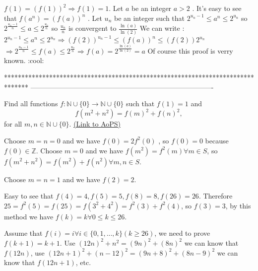 \begin{mysolution}
	$f(1)=(f(1))^{2}\Longrightarrow f(1)=1$. Let $a$ be an integer $a > 2$ . It's easy to see that $f(a^{n})=(f(a))^{n}$ . 
Let $u_{n}$ be an  integer such that $2^{u_{n}-1}\leq a^{n}\leq 2^{u_{n}}$ so $2^{\frac{u_{n}-1}n}\leq a\leq 2^{\frac{u_{n}}n}$ so  $\frac{u_{n}}n$  is convergent to $\frac{\ln (a)}{\ln (2)}$
We can write : 
$2^{u_{n}-1}\leq a^{n}\leq 2^{u_{n}}\Longrightarrow (f(2))^{u_{n}-1}\leq (f(a))^{n}\leq (f(2))2^{u_{n}}$$\Longrightarrow 2^{\frac{u_{n}-1}n}\leq f(a)\leq 2^{\frac{u_{n}}n}\Longrightarrow f(a)=2^{\frac{\ln (a)}{\ln (2)}}=a$
Of course this proof is verry known.
 :cool:
\end{mysolution}
*******************************************************************************
-------------------------------------------------------------------------------

\begin{problem}
	Find all functions $f: \mathbb N \cup \{0\} \to \mathbb N \cup \{0\}$ such that $f(1)=1$ and
\[f(m^2+n^2)=f(m)^2+f(n)^2,\]
for all $m,n \in \mathbb N \cup \{0\}$.
	\flushright \href{https://artofproblemsolving.com/community/c6h147098}{(Link to AoPS)}
\end{problem}





\begin{mysolution}Choose $m=n=0$ and we have $f(0)=2f^{2}(0)$ , so $f(0)=0$ because $f(0)\in\mathbb{Z}$.
Choose $m=0$ and we have $f(m^{2})=f^{2}(m)\forall m\in S$, so $f(m^{2}+n^{2})=f(m^{2})+f(n^{2})\forall m,n\in S$.

Choose $m=n=1$ and we have $f(2)=2$.

Easy to see that $f(4)=4,f(5)=5,f(8)=8,f(26)=26$. Therefore $25=f^{2}(5)=f(25)=f(3^{2}+4^{2})=f^{2}(3)+f^{2}(4)$, so $f(3)=3$, by this method we have $f(k)=k\forall 0\leq k\leq 26$.

Assume that $f(i)=i\forall i\in\{0,1,...,k\}(k\geq 26)$, we need to prove $f(k+1)=k+1$.
Use $(12n)^{2}+n^{2}=(9n)^{2}+(8n)^{2}$ we can know that $f(12n)$, use $(12n+1)^{2}+(n-12)^{2}=(9n+8)^{2}+(8n-9)^{2}$ we can know that $f(12n+1)$, etc. 
\end{mysolution}



